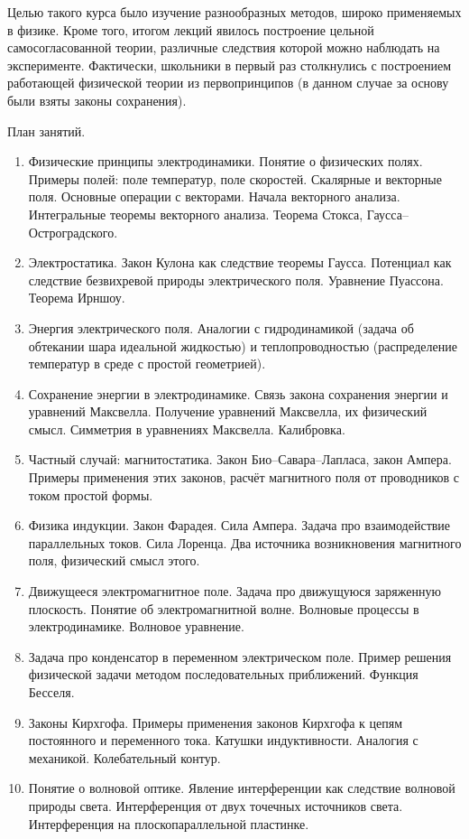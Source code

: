 \documentclass[12pt,a4paper,oneside,draft]{scrartcl}
\newlength{\h}
\newlength{\x}
\begin{document}
Целью такого курса было изучение разнообразных методов, широко
применяемых в физике. Кроме того, итогом лекций явилось построение
цельной самосогласованной теории, различные следствия которой можно
наблюдать на эксперименте. Фактически, школьники в первый раз
столкнулись с построением работающей физической теории из
первопринципов (в данном случае за основу были взяты законы
сохранения). 

\begin{center}
  \textsf{План занятий.}
\end{center}

\begin{enumerate}
\item Физические принципы электродинамики. Понятие о физических
  полях. Примеры полей: поле температур, поле скоростей. Скалярные и
  векторные поля. Основные операции с векторами. Начала векторного
  анализа. Интегральные теоремы векторного анализа. Теорема Стокса,
  Гаусса–Остроградского.
\item Электростатика. Закон Кулона как следствие теоремы
  Гаусса. Потенциал как следствие безвихревой природы электрического
  поля. Уравнение Пуассона. Теорема Ирншоу.
\item Энергия электрического поля. Аналогии с гидродинамикой (задача
  об обтекании шара идеальной жидкостью) и теплопроводностью
  (распределение температур в среде с простой геометрией).
\item Сохранение энергии в электродинамике. Связь закона сохранения
  энергии и уравнений Максвелла. Получение уравнений Максвелла, их
  физический смысл. Симметрия в уравнениях Максвелла. Калибровка.
\item Частный случай: магнитостатика. Закон Био–Савара–Лапласа, закон
  Ампера. Примеры применения этих законов, расчёт магнитного поля от
  проводников с током простой формы.
\item Физика индукции. Закон Фарадея. Сила Ампера. Задача про
  взаимодействие параллельных токов. Сила Лоренца. Два источника
  возникновения магнитного поля, физический смысл этого.
\item Движущееся электромагнитное поле. Задача про движущуюся
  заряженную плоскость. Понятие об электромагнитной волне. Волновые
  процессы в электродинамике. Волновое уравнение.
\item Задача про конденсатор в переменном электрическом поле. Пример
  решения физической задачи методом последовательных
  приближений. Функция Бесселя.
\item Законы Кирхгофа. Примеры применения законов Кирхгофа к цепям
  постоянного и переменного тока. Катушки индуктивности. Аналогия с
  механикой. Колебательный контур.
\item Понятие о волновой оптике. Явление интерференции как следствие
  волновой природы света. Интерференция от двух точечных источников
  света. Интерференция на плоскопараллельной пластинке.
\end{enumerate}
\end{document}
